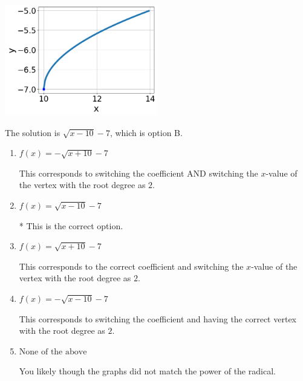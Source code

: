 \documentclass{extbook}[14pt]
\begin{document}
\begin{enumerate}
{\begin{center}
    \includegraphics[width=0.5\textwidth]{../Figures/radicalGraphToEquationC.png}
\end{center}


The solution is \( \sqrt{x - 10} - 7 \), which is option B.\begin{enumerate}[label=\Alph*.]
\item \( f(x) = - \sqrt{x + 10} - 7 \)

This corresponds to switching the coefficient AND switching the $x$-value of the vertex with the root degree as $2$.
\item \( f(x) = \sqrt{x - 10} - 7 \)

* This is the correct option.
\item \( f(x) = \sqrt{x + 10} - 7 \)

This corresponds to the correct coefficient and switching the $x$-value of the vertex with the root degree as $2$.
\item \( f(x) = - \sqrt{x - 10} - 7 \)

This corresponds to switching the coefficient and having the correct vertex with the root degree as $2$.
\item \( \text{None of the above} \)

You likely though the graphs did not match the power of the radical.
\end{enumerate}

}
\end{enumerate}
\end{document}
